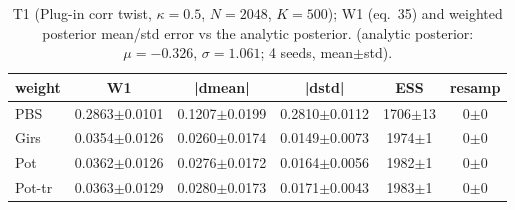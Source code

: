 \begin{table}[ht]
\centering
\caption{T1 (Plug-in corr twist, $\kappa=0.5$, $N=2048$, $K=500$); W1 (eq.~35) and weighted posterior mean/std error vs the analytic posterior. (analytic posterior: $\mu=-0.326$, $\sigma=1.061$; 4 seeds, mean$\pm$std).}
\label{tab:toy_t1_plug_in_corrected}
\begin{tabular}{lccccc}
\toprule
weight & W1 & |dmean| & |dstd| & ESS & resamp \\
\midrule
PBS & 0.2863$\pm$0.0101 & 0.1207$\pm$0.0199 & 0.2810$\pm$0.0112 & 1706$\pm$13 & 0$\pm$0 \\
Girs & 0.0354$\pm$0.0126 & 0.0260$\pm$0.0174 & 0.0149$\pm$0.0073 & 1974$\pm$1 & 0$\pm$0 \\
Pot & 0.0362$\pm$0.0126 & 0.0276$\pm$0.0172 & 0.0164$\pm$0.0056 & 1982$\pm$1 & 0$\pm$0 \\
Pot-tr & 0.0363$\pm$0.0129 & 0.0280$\pm$0.0173 & 0.0171$\pm$0.0043 & 1983$\pm$1 & 0$\pm$0 \\
\bottomrule
\end{tabular}
\end{table}

